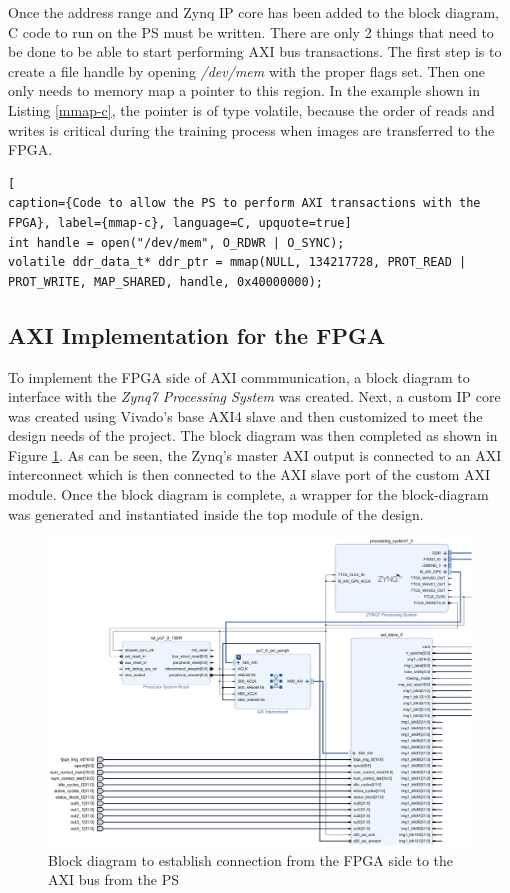 Once the address range and Zynq IP core has been added to the block diagram, C code to run on the PS must be written. There are only 2 things that need to be done to be able to start performing AXI bus transactions. The first step is to create a file handle by opening \textit{/dev/mem} with the proper flags set. Then one only needs to memory map a pointer to this region. In the example shown in Listing \ref{mmap-c}, the pointer is of type volatile, because the order of reads and writes is critical during the training process when images are transferred to the FPGA.
\begin{lstlisting}[
caption={Code to allow the PS to perform AXI transactions with the FPGA}, label={mmap-c}, language=C, upquote=true]
int handle = open("/dev/mem", O_RDWR | O_SYNC); 
volatile ddr_data_t* ddr_ptr = mmap(NULL, 134217728, PROT_READ | PROT_WRITE, MAP_SHARED, handle, 0x40000000);
\end{lstlisting}

\subsection{AXI Implementation for the FPGA}
To implement the FPGA side of AXI commmunication, a block diagram to interface with the \textit{Zynq7 Processing System} was created. Next, a custom IP core was created using Vivado's base AXI4 slave and then customized to meet the design needs of the project. The block diagram was then completed as shown in Figure \ref{system-bd}. As can be seen, the Zynq's master AXI output is connected to an AXI interconnect which is then connected to the AXI slave port of the custom AXI module. Once the block diagram is complete, a wrapper for the block-diagram was generated and instantiated inside the top module of the design.

\begin{figure}
	\centering 
	\includegraphics[width=\textwidth]{figures/fpga_axi_block}
	\caption{Block diagram to establish connection from the FPGA side to the AXI bus from the PS}\label{system-bd}
\end{figure}

